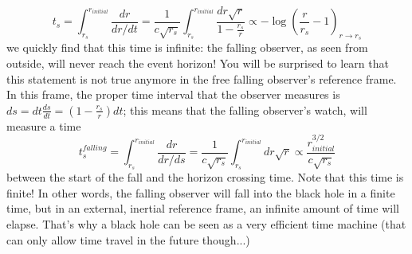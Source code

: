 \begin{equation}
t_s = \int_{r_s}^{r_{initial}}\frac{dr}{dr/dt} = \frac{1}{c\sqrt{r_s}}\int_{r_s}^{r_{initial}}\frac{dr\sqrt{r}}{1-\frac{r_s}{r}}\propto -\log\left(\frac{r}{r_s}-1\right)_{r\rightarrow r_s}
\end{equation}
we quickly find that this time is infinite: the falling observer, as seen from outside, will never reach the event horizon! You will be surprised to learn that this statement is not true anymore in the free falling observer's reference frame. In this frame, the proper time interval that the observer measures is $ds = dt\frac{ds}{dt} = \left(1-\frac{r_s}{r}\right)dt$; this means that the falling observer's watch, will measure a time
\begin{equation}
t^{falling}_s = \int_{r_s}^{r_{initial}}\frac{dr}{dr/ds} = \frac{1}{c\sqrt{r_s}}\int_{r_s}^{r_{initial}}dr\sqrt{r}\propto \frac{r_{initial}^{3/2}}{c\sqrt{r_s}}
\end{equation}
between the start of the fall and the horizon crossing time. Note that this time is finite! In other words, the falling observer will fall into the black hole in a finite time, but in an external, inertial reference frame, an infinite amount of time will elapse. That's why a black hole can be seen as a very efficient time machine (that can only allow time travel in the future though...)
